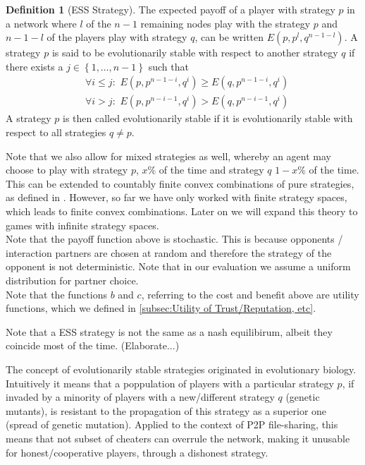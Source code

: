 \documentclass[11pt,a4paper]{article}
\theoremstyle{definition}
\newtheorem{definition}{Definition}[section]
\theoremstyle{theorem}
\theoremstyle{proposition}
\theoremstyle{corollary}
\theoremstyle{lemma}
\theoremstyle{example}
\theoremstyle{remark}
\begin{document}
\begin{definition}[ESS Strategy]
The expected payoff of a player with strategy $p$ in a network where $l$ of the $n-1$ remaining nodes play with the strategy $p$ and $n-1-l$ of the players play with strategy $q$, can be written $E(p,p^l,q^{n-1-l})$. A strategy $p$ is said to be evolutionarily stable with respect to another strategy $q$ if there exists a $j\in\left\lbrace{}1,\ldots,n-1\right\rbrace$ such that
\begin{align}
&\forall{}i\leq{}j:\,\,E(p,p^{n-1-i},q^i)\geq{}E(q,p^{n-1-i},q^i)\\
&\forall{}i>j:\,\,E(p,p^{n-i-1},q^i) > E(q,p^{n-i-1},q^i)
\end{align}
A strategy $p$ is then called evolutionarily stable if it is evolutionarily stable with respect to all strategies $q\neq{}p$. 
\end{definition}
Note that we also allow for mixed strategies as well, whereby an agent may choose to play with strategy $p$, $x\%$ of the time and strategy $q$ $1-x\%$ of the time. This can be extended to countably finite convex combinations of pure strategies, as defined in \cite{Game Theory}. However, so far we have only worked with finite strategy spaces, which leads to finite convex combinations. Later on we will expand this theory to games with infinite strategy spaces.\vspace{1em}\\
\noindent{} Note that the payoff function above is stochastic. This is because opponents / interaction partners are chosen at random and therefore the strategy of the opponent is not deterministic. Note that in our evaluation we assume a uniform distribution for partner choice. \vspace{1em}\\

\noindent{} Note that the functions $b$ and $c$, referring to the cost and benefit above are utility functions, which we defined in \ref{subsec:Utility of Trust/Reputation, etc}.  
	
\noindent{} Note that a ESS strategy is not the same as a nash equilibirum, albeit they coincide most of the time. (Elaborate...)

\noindent{} The concept of evolutionarily stable strategies originated in evolutionary biology. Intuitively it means that a poppulation of players with a particular strategy $p$, if invaded by a minority of players with a new/different strategy $q$ (genetic mutants), is resistant to the propagation of this strategy as a superior one (spread of genetic mutation). Applied to the context of P2P file-sharing, this means that not subset of cheaters can overrule the network, making it unusable for honest/cooperative players, through a dishonest strategy.\vspace{1em}\\  
\end{document}
